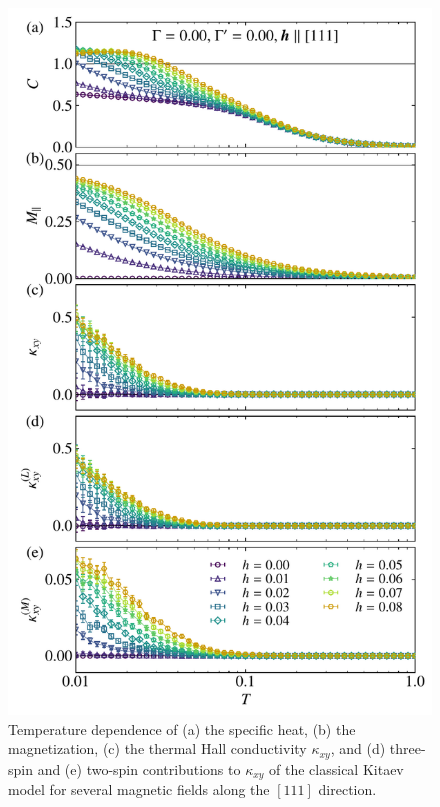 \documentclass[twocolumn,superscriptaddress,showpacs, longbibliography, aps, prx]{revtex4-2}
\begin{document}
\begin{figure}[tbh] 
\begin{center} 
\includegraphics[width=\linewidth]{Data_for_figs/plot/fig-12-classical-hdep.pdf}
\vspace{-0.5cm} 
\caption{Temperature dependence of (a) the specific heat, (b) the magnetization, (c) the thermal Hall conductivity $\kappa_{xy}$, and (d) three-spin and (e) two-spin contributions to $\kappa_{xy}$ of the classical Kitaev model for several magnetic fields along the $[111]$ direction.}
\label{fig_classical_hdep}
\end{center}
\end{figure}
\end{document}
